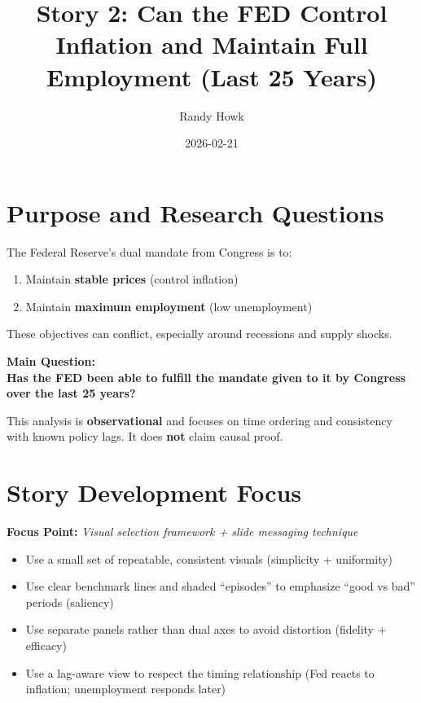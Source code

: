 \documentclass[
  11pt,
]{article}
\title{Story 2: Can the FED Control Inflation and Maintain Full
Employment (Last 25 Years)}
\author{Randy Howk}
\date{2026-02-21}
\providecommand{\tightlist}{%
  \setlength{\itemsep}{0pt}\setlength{\parskip}{0pt}}
\begin{document}
\maketitle

{
\setcounter{tocdepth}{2}
\tableofcontents
}
\section{Purpose and Research
Questions}\label{purpose-and-research-questions}

The Federal Reserve's dual mandate from Congress is to:

\begin{enumerate}
\def\labelenumi{\arabic{enumi}.}
\tightlist
\item
  Maintain \textbf{stable prices} (control inflation)\\
\item
  Maintain \textbf{maximum employment} (low unemployment)
\end{enumerate}

These objectives can conflict, especially around recessions and supply
shocks.

\textbf{Main Question:}\\
\textbf{Has the FED been able to fulfill the mandate given to it by
Congress over the last 25 years?}

This analysis is \textbf{observational} and focuses on time ordering and
consistency with known policy lags. It does \textbf{not} claim causal
proof.

\section{Story Development Focus}\label{story-development-focus}

\textbf{Focus Point:} \emph{Visual selection framework + slide messaging
technique}

\begin{itemize}
\tightlist
\item
  Use a small set of repeatable, consistent visuals (simplicity +
  uniformity)
\item
  Use clear benchmark lines and shaded ``episodes'' to emphasize ``good
  vs bad'' periods (saliency)
\item
  Use separate panels rather than dual axes to avoid distortion
  (fidelity + efficacy)
\item
  Use a lag-aware view to respect the timing relationship (Fed reacts to
  inflation; unemployment responds later)
\end{itemize}
\end{document}

